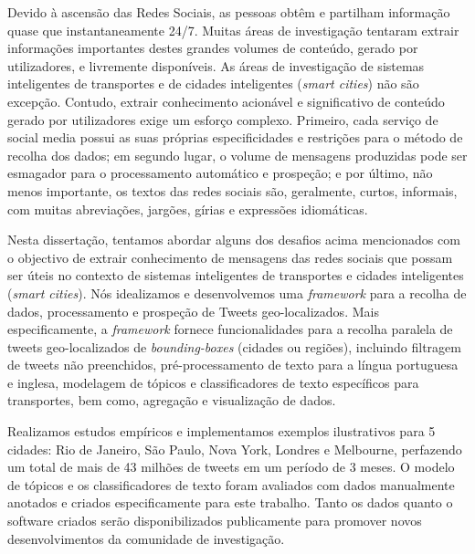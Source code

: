 Devido à ascensão das Redes Sociais, as pessoas obtêm e partilham informação quase que instantaneamente 24/7. Muitas áreas de investigação tentaram extrair informações importantes destes grandes volumes de conteúdo, gerado por utilizadores, e livremente disponíveis. As áreas de investigação de sistemas inteligentes de transportes e de cidades inteligentes (\textit{smart cities}) não são excepção. Contudo, extrair conhecimento acionável e significativo de conteúdo gerado por utilizadores exige um esforço complexo. Primeiro, cada serviço de social media possui as suas próprias especificidades e restrições para o método de recolha dos dados; em segundo lugar, o volume de mensagens produzidas pode ser esmagador para o processamento automático e prospeção; e por último, não menos importante, os textos das redes sociais são, geralmente, curtos, informais, com muitas abreviações, jargões, gírias e expressões idiomáticas. 

Nesta dissertação, tentamos abordar alguns dos desafios acima mencionados com o objectivo de extrair conhecimento de mensagens das redes sociais que possam ser úteis no contexto de sistemas inteligentes de transportes e cidades inteligentes (\textit{smart cities}). Nós idealizamos e desenvolvemos uma \textit{framework} para a recolha de dados, processamento e prospeção de Tweets geo-localizados. Mais especificamente, a \textit{framework} fornece funcionalidades para a recolha paralela de tweets geo-localizados de \textit{bounding-boxes} (cidades ou regiões), incluindo filtragem de tweets não preenchidos, pré-processamento de texto para a língua portuguesa e inglesa, modelagem de tópicos e classificadores de texto específicos para transportes, bem como, agregação e visualização de dados.

Realizamos estudos empíricos e implementamos exemplos ilustrativos para 5 cidades: Rio de Janeiro, São Paulo, Nova York, Londres e Melbourne, perfazendo um total de mais de 43 milhões de tweets em um período de 3 meses. O modelo de tópicos e os classificadores de texto foram avaliados com dados manualmente anotados e criados especificamente para este trabalho. Tanto os dados quanto o software criados serão disponibilizados publicamente para promover novos desenvolvimentos da comunidade de investigação.